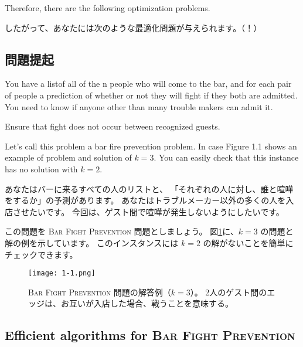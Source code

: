\documentclass{jsarticle}
\begin{document}
\begin{screen}
    Therefore, there are the following optimization problems.
\end{screen}
したがって、あなたには次のような最適化問題が与えられます。（！）

\newpage



\subsection{問題提起}
\begin{screen}
You have a listof all of the n people who will come to the bar, 
and for each pair of people
a prediction of whether or not they will fight if they both are admitted.
You need to know if anyone other than many trouble makers can admit it.

Ensure that fight does not occur between recognized guests. 

Let's call this problem a bar fire prevention problem.
In case Figure 1.1 shows an example of problem and solution of $k=3$. 
You can easily check that this instance has no solution with $k=2$.
\end{screen}

あなたはバーに来るすべての人のリストと、
「それぞれの人に対し、誰と喧嘩をするか」の予測があります。
あなたはトラブルメーカー以外の多くの人を入店させたいです。
今回は、ゲスト間で喧嘩が発生しないようにしたいです。

この問題を \textsc{Bar Fight Prevention} 問題としましょう。
図\ref{fig:1.1}に、$k=3$ の問題と解の例を示しています。
このインスタンスには $k=2$ の解がないことを簡単にチェックできます。

\begin{figure}[htbp]
    \centering

      \texttt{[image: 1-1.png]}
      
      \centering
      \caption{
        \textsc{Bar Fight Prevention} 問題の解答例（$k=3$）。             
          2人のゲスト間のエッジは、お互いが入店した場合、戦うことを意味する。
        }
      \label{fig:1.1}
  \end{figure}

\newpage



\subsection{Efficient algorithms for \textsc{Bar Fight Prevention}}
\end{document}
